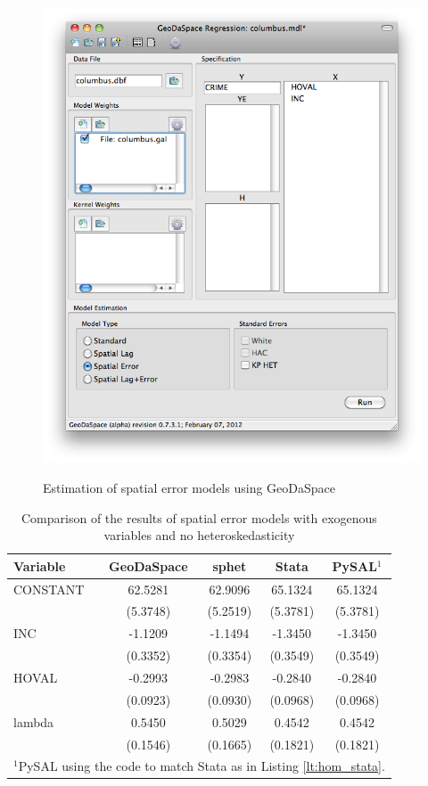 \documentclass{article}
\begin{document}
\begin{figure}[htb]
\caption{Estimation of spatial error models using GeoDaSpace}
\label{f:GS_hom}
\begin{center}
\includegraphics[width=0.7\linewidth]{GS_hom.png}\\
\end{center}
\end{figure}

\begin{table}[htpb]
\caption{Comparison of the results of spatial error models with exogenous variables and no heteroskedasticity}
\label{t:res_hom}
\centering
\begin{small}
\begin{tabular}{l|cccc} \hline
\textbf{Variable}&\textbf{GeoDaSpace}&\textbf{sphet}&\textbf{Stata}&\textbf{PySAL$^1$}\\ \hline
CONSTANT&62.5281&62.9096&65.1324&65.1324\\
&(5.3748)&(5.2519)&(5.3781)&(5.3781)\\
INC&-1.1209&-1.1494&-1.3450&-1.3450\\
&(0.3352)&(0.3354)&(0.3549)&(0.3549)\\
HOVAL&-0.2993&-0.2983&-0.2840&-0.2840\\
&(0.0923)&(0.0930)&(0.0968)&(0.0968)\\
lambda&0.5450&0.5029&0.4542&0.4542\\
&(0.1546)&(0.1665)&(0.1821)&(0.1821)\\
\hline
\multicolumn{5}{l}{\scriptsize{$^1$PySAL using the code to match Stata as in Listing \ref{lt:hom_stata}.}} \\
\end{tabular}
\end{small}
\end{table}
\end{document}

